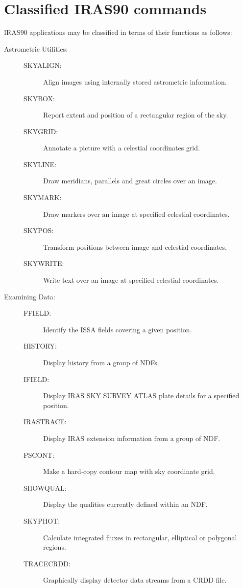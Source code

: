 \newpage
\section{Classified IRAS90 commands}
\label{ap:classified}

{\small IRAS90} applications may be classified in terms of their
functions as follows:
\begin{description}

\item [Astrometric Utilities:]
\mbox{}
\begin{description}
\item[SKYALIGN: ] Align images using internally stored astrometric
information.
\item[SKYBOX:   ] Report extent and position of a rectangular region of the
sky.
\item[SKYGRID:  ] Annotate a picture with a celestial coordinates grid.
\item[SKYLINE:  ] Draw meridians, parallels and great circles over an
image.
\item[SKYMARK:  ] Draw markers over an image at specified celestial
coordinates.
\item[SKYPOS:   ] Transform positions between image and celestial
coordinates.
\item[SKYWRITE: ] Write text over an image at specified celestial
coordinates.
\end{description}

\item [Examining Data:]
\mbox{}
\begin{description}
\item[FFIELD:   ] Identify the ISSA fields covering a given position.
\item[HISTORY:  ] Display history from a group of NDFs.
\item[IFIELD:   ] Display IRAS SKY SURVEY ATLAS plate details for a 
specified position.
\item[IRASTRACE:] Display IRAS extension information from a group of NDF.
\item[PSCONT:   ] Make a hard-copy contour map with sky coordinate grid.
\item[SHOWQUAL: ] Display the qualities currently defined within an NDF.
\item[SKYPHOT:  ] Calculate integrated fluxes in rectangular, elliptical or
polygonal regions.
\item[TRACECRDD: ] Graphically display detector data streams from a CRDD
file.
\end{description}


\end{description}
